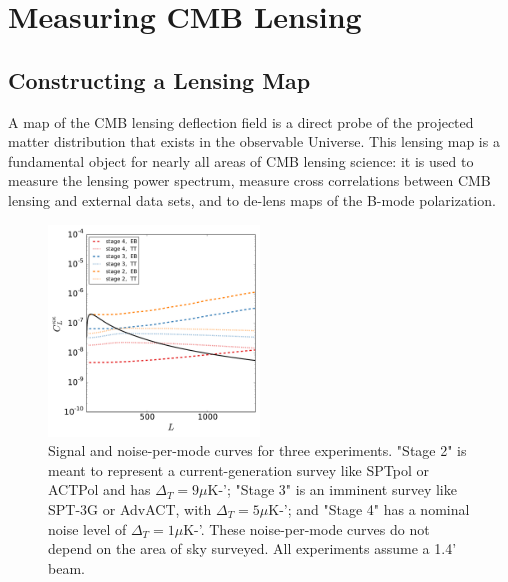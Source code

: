 \section{Measuring CMB Lensing}

\subsection{Constructing a Lensing Map}\label{kappaMap}

A map of the CMB lensing deflection field is a direct probe of the projected matter distribution that exists in the observable Universe. This lensing map is a fundamental object for nearly all areas of CMB lensing science: it is used to measure the lensing power spectrum, measure cross correlations between CMB lensing and external data sets, and to de-lens maps of the B-mode polarization.  

\begin{figure}[htbp]
\centering
\includegraphics[width=0.5\textwidth]{CMBLensing/n0s_s4.pdf}
\caption{Signal and noise-per-mode curves for three experiments. "Stage 2" is meant to represent a current-generation survey like SPTpol or ACTPol and has $\Delta_T = 9 \mu$K-';  "Stage 3" is an imminent survey like SPT-3G or AdvACT, with $\Delta_T = 5 \mu$K-'; and "Stage 4" has a nominal noise level of  $\Delta_T = 1 \mu$K-'.   These noise-per-mode curves do not depend on the area of sky surveyed.  All experiments assume a 1.4' beam.}  
\label{n0s_s4}
\end{figure}



